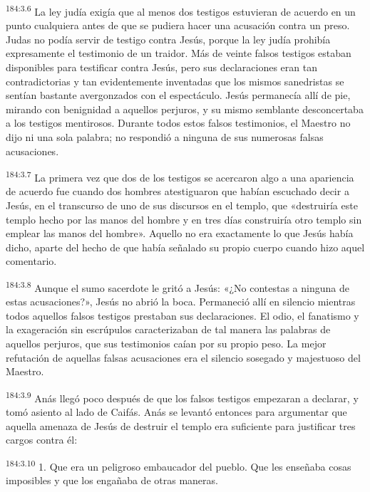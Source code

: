 \par 
\textsuperscript{184:3.6} La ley judía exigía que al menos dos testigos estuvieran de acuerdo en un punto cualquiera antes de que se pudiera hacer una acusación contra un preso. Judas no podía servir de testigo contra Jesús, porque la ley judía prohibía expresamente el testimonio de un traidor. Más de veinte falsos testigos estaban disponibles para testificar contra Jesús, pero sus declaraciones eran tan contradictorias y tan evidentemente inventadas que los mismos sanedristas se sentían bastante avergonzados con el espectáculo. Jesús permanecía allí de pie, mirando con benignidad a aquellos perjuros, y su mismo semblante desconcertaba a los testigos mentirosos. Durante todos estos falsos testimonios, el Maestro no dijo ni una sola palabra; no respondió a ninguna de sus numerosas falsas acusaciones.

\par 
\textsuperscript{184:3.7} La primera vez que dos de los testigos se acercaron algo a una apariencia de acuerdo fue cuando dos hombres atestiguaron que habían escuchado decir a Jesús, en el transcurso de uno de sus discursos en el templo, que «destruiría este templo hecho por las manos del hombre y en tres días construiría otro templo sin emplear las manos del hombre». Aquello no era exactamente lo que Jesús había dicho, aparte del hecho de que había señalado su propio cuerpo cuando hizo aquel comentario.

\par 
\textsuperscript{184:3.8} Aunque el sumo sacerdote le gritó a Jesús: «¿No contestas a ninguna de estas acusaciones?», Jesús no abrió la boca. Permaneció allí en silencio mientras todos aquellos falsos testigos prestaban sus declaraciones. El odio, el fanatismo y la exageración sin escrúpulos caracterizaban de tal manera las palabras de aquellos perjuros, que sus testimonios caían por su propio peso. La mejor refutación de aquellas falsas acusaciones era el silencio sosegado y majestuoso del Maestro.

\par 
\textsuperscript{184:3.9} Anás llegó poco después de que los falsos testigos empezaran a declarar, y tomó asiento al lado de Caifás. Anás se levantó entonces para argumentar que aquella amenaza de Jesús de destruir el templo era suficiente para justificar tres cargos contra él:

\par 
\textsuperscript{184:3.10} 1. Que era un peligroso embaucador del pueblo. Que les enseñaba cosas imposibles y que los engañaba de otras maneras.

